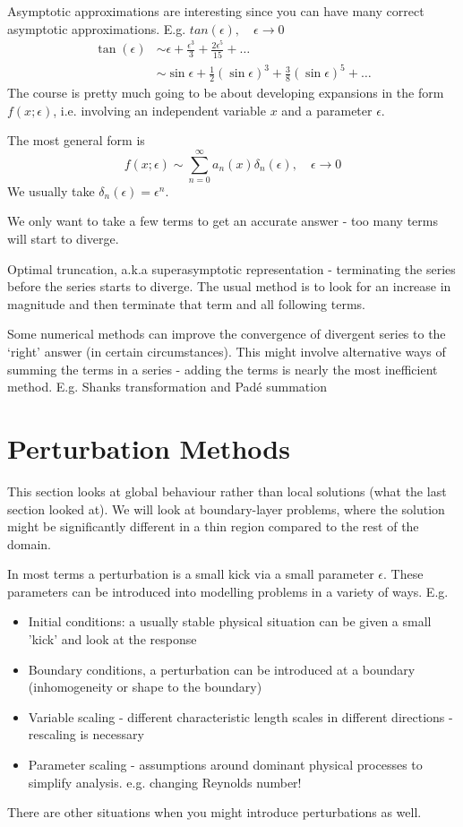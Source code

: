 \documentclass{/home/janmebows/Documents/LatexTemplates/myassignment}
\begin{document}
Asymptotic approximations are interesting since you can have many correct asymptotic approximations. E.g. $tan(\epsilon), \quad \epsilon\to 0$
\begin{align*}
    \tan(\epsilon)&\sim \epsilon + \frac{\epsilon^3}{3} + \frac{2\epsilon^5}{15} + \hdots\\
    &\sim \sin\epsilon + \frac12 (\sin \epsilon)^3 + \frac{3}{8}(\sin\epsilon)^5 +\hdots
\end{align*}
The course is pretty much going to be about developing expansions in the form $f(x;\epsilon)$, i.e. involving an independent variable $x$ and a parameter $\epsilon$.

The most general form is
\[f(x;\epsilon) \sim \sum_{n=0}^\infty a_n(x) \delta_n(\epsilon), \quad \epsilon\to0\]
We usually take $\delta_n(\epsilon) = \epsilon^n$.

We only want to take a few terms to get an accurate answer - too many terms will start to diverge.



Optimal truncation, a.k.a superasymptotic representation - terminating the series before the series starts to diverge. The usual method is to look for an increase in magnitude and then terminate that term and all following terms.

Some numerical methods can improve the convergence of divergent series to the `right' answer (in certain circumstances). This might involve alternative ways of summing the terms in a series - adding the terms is nearly the most inefficient method. E.g. Shanks transformation and Pad\'e summation


\section{Perturbation Methods}

This section looks at global behaviour rather than local solutions (what the last section looked at). We will look at boundary-layer problems, where the solution might be significantly different in a thin region compared to the rest of the domain. 

In most terms a perturbation is a small kick via a small parameter $\epsilon$. These parameters can be introduced into modelling problems in a variety of ways. E.g.
\begin{itemize}
    \item Initial conditions: a usually stable physical situation can be given a small 'kick' and look at the response
    \item Boundary conditions, a perturbation can be introduced at a boundary (inhomogeneity or shape to the boundary)
    \item Variable scaling - different characteristic length scales in different directions - rescaling is necessary
    \item Parameter scaling - assumptions around dominant physical processes to simplify analysis. e.g. changing Reynolds number! 
\end{itemize}
There are other situations when you might introduce perturbations as well.
\end{document}
